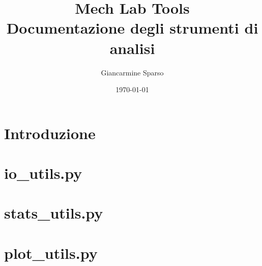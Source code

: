 \documentclass[11pt,a4paper]{report}
\title{Mech Lab Tools\\[0.4em]\large Documentazione degli strumenti di analisi}
\author{Giancarmine Sparso}
\date{\today}
\begin{document}
\maketitle
\tableofcontents
\clearpage


\chapter*{Introduzione}


\chapter{io\_utils.py}

\chapter{stats\_utils.py}


\chapter{plot\_utils.py}

\end{document}
